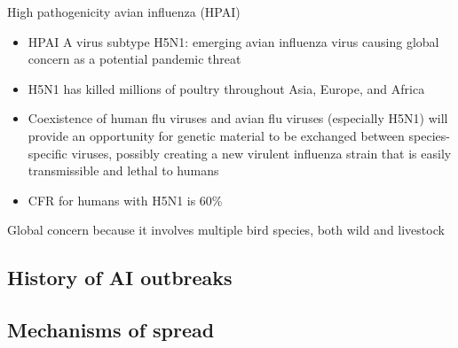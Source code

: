\documentclass[aspectratio=43]{beamer}
\begin{document}
\begin{frame}{High pathogenicity avian influenza (HPAI)}
  \begin{itemize}
    \item HPAI A virus subtype H5N1: emerging avian influenza virus causing global concern as a potential pandemic threat
    \vfill
    \item H5N1 has killed millions of poultry throughout Asia, Europe, and Africa
    \vfill
    \item Coexistence of human flu viruses and avian flu viruses (especially H5N1) will provide an opportunity for genetic material to be exchanged between species-specific viruses, possibly creating a new virulent influenza strain that is easily transmissible and lethal to humans
    \vfill
    \item CFR for humans with H5N1 is 60\%
  \end{itemize}
\end{frame}

\begin{frame}
  Global concern because it involves multiple bird species, both wild and livestock
\end{frame}

\subsection{History of AI outbreaks}







\subsection{Mechanisms of spread}

\end{document}
